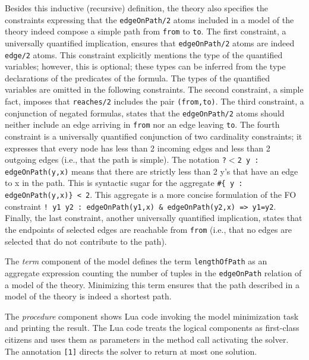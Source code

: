 \documentclass{tlp}
\renewcommand{\|}{\ensuremath{\,|\,}}
\renewcommand{\|}{\,|\,}
\begin{document}
Besides this inductive (recursive) definition, the theory also
specifies the constraints expressing that the \texttt{edgeOnPath/2}
atoms included in a model of the theory indeed compose a simple path
from \texttt{from} to \texttt{to}. The first constraint, a universally
quantified implication, ensures that \texttt{edgeOnPath/2} atoms are
indeed \texttt{edge/2} atoms. This constraint explicitly mentions the
type of the quantified variables; however, this is optional; these
types can be inferred from the type declarations of the predicates of
the formula. The types of the quantified variables are omitted in the
following constraints.  The second constraint, a simple fact, imposes
that \texttt{reaches/2} includes the pair \texttt{(from,to)}. The
third constraint, a conjunction of negated formulas, states that the
\texttt{edgeOnPath/2} atoms should neither include an edge arriving in
\texttt{from} nor an edge leaving \texttt{to}.  The fourth constraint
is a universally quantified conjunction of two cardinality
constraints; it expresses that every node has less than 2 incoming
edges and less than 2 outgoing edges (i.e., that the path is
simple). The notation {\tt ?$<$2 y : edgeOnPath(y,x)} means that there
are strictly less than 2 y's that have an edge to x in the path. This
is syntactic sugar for the aggregate {\tt \#\{ y : edgeOnPath(y,x)\} <
  2}. This aggregate is a more concise formulation of the FO
constraint {\tt ! y1 y2 : edgeOnPath(y1,x) \& edgeOnPath(y2,x) =>
  y1=y2}.  Finally, the last constraint, another universally
quantified implication, states that the endpoints of selected edges
are reachable from \texttt{from} (i.e., that no edges are selected
that do not contribute to the path).

The {\em term} component of the model defines the term
\texttt{lengthOfPath} as an aggregate expression counting the number
of tuples in the \texttt{edgeOnPath} relation of a model of the
theory. Minimizing this term ensures that the path described in a
model of the theory is indeed a shortest path.


The {\em procedure} component
shows Lua code invoking the model minimization task and printing the
result. The Lua code treats the logical components as first-class
citizens and uses them as parameters in the method call activating the
solver. The annotation \texttt{[1]} directs the solver to return at
most one solution.


\end{document}
